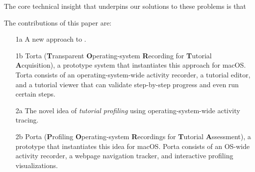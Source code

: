 The core technical insight that underpins our solutions to these problems is
that 

The contributions of this paper are:

\begin{itemize}\itemsep0pt

\item [1a] A new approach to .

\item [1b] Torta (\textbf{T}ransparent \textbf{O}perating-system 
\textbf{R}ecording for \textbf{T}utorial \textbf{A}cquisition), a 
prototype system that instantiates this approach for macOS. Torta 
consists of an operating-system-wide activity recorder, a
tutorial editor, and a tutorial viewer that can validate step-by-step
progress and even run certain steps.

\item [2a] The novel idea of \emph{tutorial profiling} using operating-system-wide activity tracing.

\item [2b] Porta (\textbf{P}rofiling \textbf{O}perating-system 
\textbf{R}ecordings for \textbf{T}utorial \textbf{A}ssessment), a 
prototype that instantiates this idea for macOS. Porta consists of an
OS-wide activity recorder, a webpage navigation tracker, and interactive
profiling visualizations.

\end{itemize}



